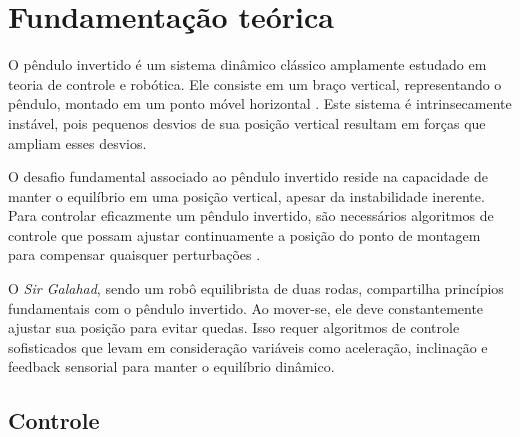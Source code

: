 
\chapter{Fundamentação teórica}

O pêndulo invertido é um sistema dinâmico clássico amplamente estudado em teoria de controle e robótica. Ele consiste em um braço vertical, representando o pêndulo, montado em um ponto móvel horizontal \cite{Kajita2001}. Este sistema é intrinsecamente instável, pois pequenos desvios de sua posição vertical resultam em forças que ampliam esses desvios. \cite{Ogata2009}

O desafio fundamental associado ao pêndulo invertido reside na capacidade de manter o equilíbrio em uma posição vertical, apesar da instabilidade inerente. Para controlar eficazmente um pêndulo invertido, são necessários algoritmos de controle que possam ajustar continuamente a posição do ponto de montagem para compensar quaisquer perturbações \cite{Spon2005}.

O \textit{Sir Galahad}, sendo um robô equilibrista de duas rodas, compartilha princípios fundamentais com o pêndulo invertido. Ao mover-se, ele deve constantemente ajustar sua posição para evitar quedas. Isso requer algoritmos de controle sofisticados que levam em consideração variáveis como aceleração, inclinação e feedback sensorial para manter o equilíbrio dinâmico.











\section{Controle}

